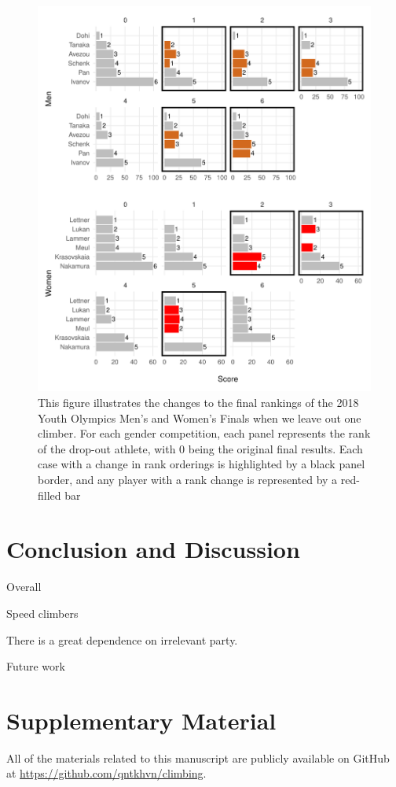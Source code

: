 \documentclass[12pt]{article}
\begin{document}
\begin{figure}
\centering
\includegraphics{draft_files/figure-latex/unnamed-chunk-12-1.pdf}
\caption{This figure illustrates the changes to the final rankings of
the 2018 Youth Olympics Men's and Women's Finals when we leave out one
climber. For each gender competition, each panel represents the rank of
the drop-out athlete, with 0 being the original final results. Each case
with a change in rank orderings is highlighted by a black panel border,
and any player with a rank change is represented by a red-filled bar}
\end{figure}

\hypertarget{conclusion-and-discussion}{%
\section{Conclusion and Discussion}\label{conclusion-and-discussion}}

Overall

Speed climbers

There is a great dependence on irrelevant party.

Future work

\hypertarget{supplementary-material}{%
\section*{Supplementary Material}\label{supplementary-material}}

All of the materials related to this manuscript are publicly available
on GitHub at \newline \url{https://github.com/qntkhvn/climbing}.



\end{document}
